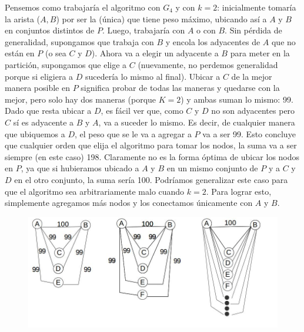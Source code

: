 \documentclass[a4paper]{article}
\begin{document}
Pensemos como trabajaría el algoritmo con $G_4$ y con $k = 2$: inicialmente tomaría la arista ($A, B$) por ser la (única) que tiene peso máximo, ubicando así a $A$ y $B$ en conjuntos distintos de $P$. Luego, trabajaría con $A$ o con $B$. Sin pérdida de generalidad, supongamos que trabaja con $B$ y encola los adyacentes de $A$ que no están en $P$ (o sea $C$ y $D$). Ahora va a elegir un adyacente a $B$ para meter en la partición, supongamos que elige a $C$ (nuevamente, no perdemos generalidad porque si eligiera a $D$ sucedería lo mismo al final). Ubicar a $C$ de la mejor manera posible en $P$ significa probar de todas las maneras y quedarse con la mejor, pero solo hay dos maneras (porque $K = 2$) y ambas suman lo mismo: 99. Dado que resta ubicar a $D$, es fácil ver que, como $C$ y $D$ no son adyacentes pero $C$ sí es adyacente a $B$ y $A$, va a suceder lo mismo. Es decir, de cualquier manera que ubiquemos a $D$, el peso que se le va a agregar a $P$ va a ser 99. Esto concluye que cualquier orden que elija el algoritmo para tomar los nodos, la suma va a ser siempre (en este caso) 198.
\newline Claramente no es la forma óptima de ubicar los nodos en $P$, ya que si hubieramos ubicado a $A$ y $B$ en un mismo conjunto de $P$ y a $C$ y $D$ en el otro conjunto, la suma sería 100.
\newline
\newline Podríamos generalizar este caso para que el algoritmo sea arbitrariamente malo cuando $k = 2$. Para lograr esto, simplemente agregamos más nodos y los conectamos únicamente con $A$ y $B$.
\begin{figure}[h]
\centering
\includegraphics[scale=0.5]{grafoHGolosaMala3.jpg}
\end{figure}
\pagebreak
\end{document}
